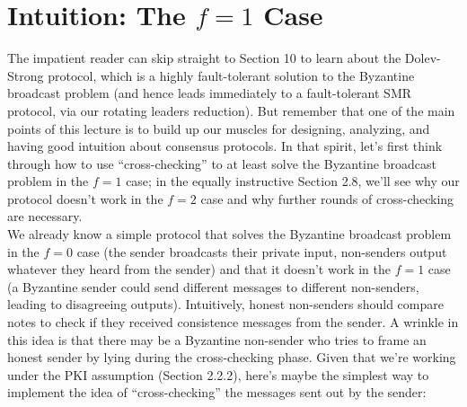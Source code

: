 \section{Intuition: The $f = 1$ Case}
The impatient reader can skip straight to Section 10 to learn about the Dolev-Strong protocol, which is a highly fault-tolerant solution to the Byzantine broadcast problem (and hence
leads immediately to a fault-tolerant SMR protocol, via our rotating leaders reduction). But
remember that one of the main points of this lecture is to build up our muscles for designing,
analyzing, and having good intuition about consensus protocols. In that spirit, let’s first
think through how to use “cross-checking” to at least solve the Byzantine broadcast problem in the $f = 1$ case; in the equally instructive Section 2.8, we’ll see why our protocol doesn’t work in the $f = 2$ case and why further rounds of cross-checking are necessary.\\
We already know a simple protocol that solves the Byzantine broadcast problem in the
$f = 0$ case (the sender broadcasts their private input, non-senders output whatever they
heard from the sender) and that it doesn’t work in the $f = 1$ case (a Byzantine sender could
send different messages to different non-senders, leading to disagreeing outputs). Intuitively,
honest non-senders should compare notes to check if they received consistence messages from
the sender. A wrinkle in this idea is that there may be a Byzantine non-sender who tries to
frame an honest sender by lying during the cross-checking phase.
Given that we’re working under the PKI assumption (Section 2.2.2), here’s maybe the simplest way to implement the idea of “cross-checking” the messages sent out by the sender:


